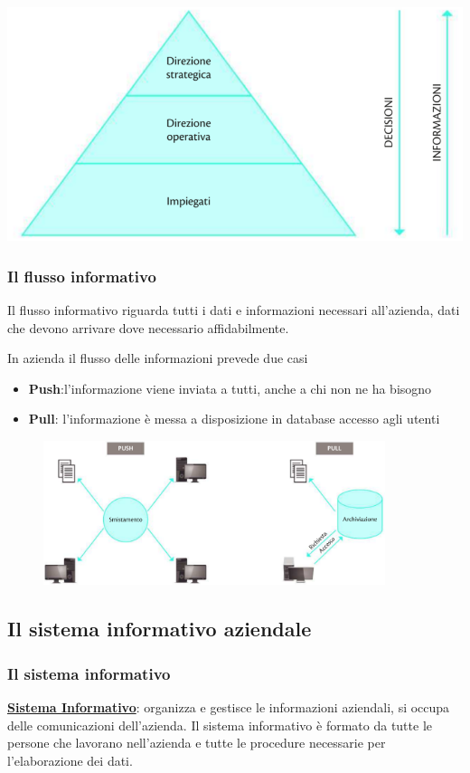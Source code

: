 \documentclass{article}
\begin{document}
\begin{center}
\includegraphics[h, scale=0.7]{pir.PNG}
\end{center}
\subsubsection{Il flusso informativo}
Il flusso informativo riguarda tutti i dati e informazioni necessari all'azienda, dati che devono arrivare dove necessario affidabilmente.


In azienda il flusso delle informazioni prevede due casi
\begin{itemize}
    \item \textbf{Push}:l'informazione viene inviata a tutti, anche a chi non ne ha bisogno
    \item \textbf{Pull}: l'informazione è messa a disposizione in database accesso agli utenti
\end{itemize}
\begin{figure}[h!]
    \centering
    \includegraphics[width=10cm]{Untitled picture.png}
\end{figure}
\subsection{Il sistema informativo aziendale}
\subsubsection{Il sistema informativo}
\underline{\textbf{Sistema Informativo}}: organizza e gestisce le informazioni aziendali, si occupa delle comunicazioni dell'azienda. Il sistema informativo è formato da tutte le persone che lavorano nell'azienda e tutte le procedure necessarie per l'elaborazione dei dati.
\end{document}
